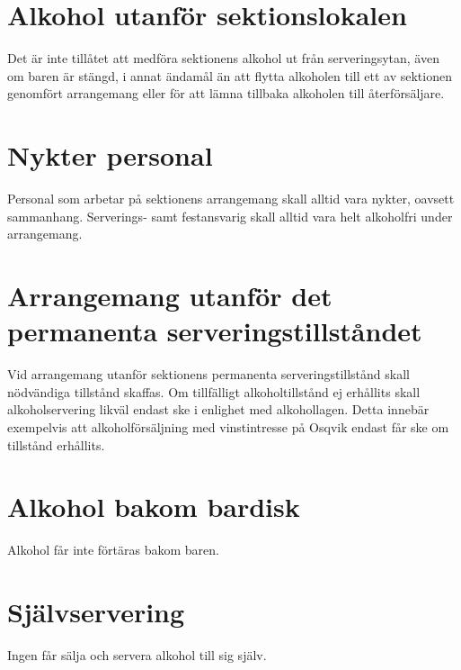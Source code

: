 \documentclass{dgovdoc}
\begin{document}
\section{Alkohol utanför sektionslokalen}

Det är inte tillåtet att medföra sektionens alkohol ut från serveringsytan,
även om baren är stängd, i annat ändamål än att flytta alkoholen till ett av
sektionen genomfört arrangemang eller för att lämna tillbaka alkoholen till
återförsäljare.

\section{Nykter personal}

Personal som arbetar på sektionens arrangemang skall alltid vara nykter,
oavsett sammanhang. Serverings- samt festansvarig skall alltid vara helt
alkoholfri under arrangemang.

\section{Arrangemang utanför det permanenta serveringstillståndet}

Vid arrangemang utanför sektionens permanenta serveringstillstånd skall
nödvändiga tillstånd skaffas. Om tillfälligt alkoholtillstånd ej erhållits
skall alkoholservering likväl endast ske i enlighet med alkohollagen. Detta
innebär exempelvis att alkoholförsäljning med vinstintresse på Osqvik endast
får ske om tillstånd erhållits.

\section{Alkohol bakom bardisk}

Alkohol får inte förtäras bakom baren.

\section{Självservering}

Ingen får sälja och servera alkohol till sig själv.
\end{document}
